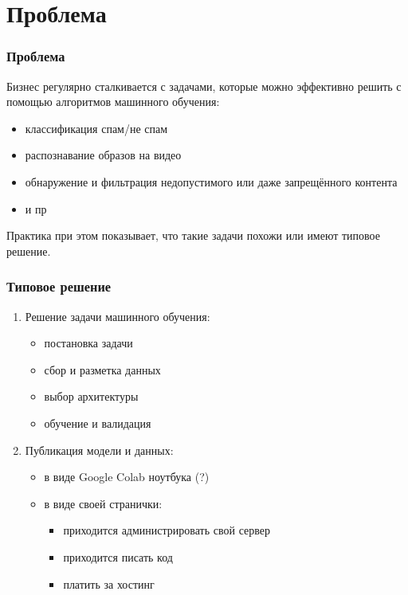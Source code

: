 \section{Проблема}

\begin{frame}
\frametitle{Проблема}
Бизнес регулярно сталкивается с задачами, которые можно эффективно решить с помощью алгоритмов машинного обучения:
\begin{itemize}
    \item классификация спам/не спам
    \item распознавание образов на видео
    \item обнаружение и фильтрация недопустимого или даже запрещённого контента
    \item и пр
\end{itemize}

\bigskip
\pause

Практика при этом показывает, что \alert{такие задачи похожи или имеют типовое решение.}
\end{frame}

\begin{frame}
\frametitle{Типовое решение}
\begin{enumerate}
    \item<1-> Решение задачи машинного обучения:
    \begin{itemize}
        \item постановка задачи
        \item сбор и разметка данных
        \item выбор архитектуры
        \item обучение и валидация
    \end{itemize}
    \item<2-> Публикация модели и данных:
    \begin{itemize}
        \item в виде Google Colab ноутбука (?)
        \item в виде своей странички:
        \begin{itemize}
            \item приходится администрировать свой сервер
            \item приходится писать код
            \item платить за хостинг
        \end{itemize}
    \end{itemize}
\end{enumerate}
\end{frame}

